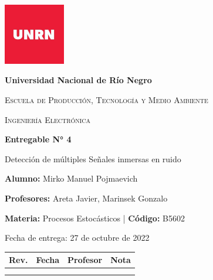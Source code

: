\documentclass[12pt,letterpaper]{article}     %
\begin{document}

\begin{titlepage}
\centering
{\includegraphics[width=0.2\textwidth]{imagenes/LOGOUNRN.jpg}\par}
\vspace{0.5cm}
{\bfseries\large Universidad Nacional de Río Negro \par}
\vspace{0.5cm}
{\scshape\large Escuela de Producción, Tecnología y Medio Ambiente \par}
\vspace{0.5cm}
{\scshape\large Ingeniería Electrónica \par}
\vspace{3cm}
{\bfseries\Large Entregable N° 4 \par}
{\Large Detección de múltiples Señales inmersas en ruido\par}
\vfill
{\large \textbf{Alumno:} Mirko Manuel Pojmaevich\par}
{\large \textbf{Profesores:} Areta Javier, Marinsek Gonzalo\par}
{\large \textbf{Materia:} Procesos Estocásticos | \textbf{Código:} B5602\par}
\vspace{3cm}
{\large Fecha de entrega: 27 de octubre de 2022 \par}
\vspace{1cm}
\begin{table}[!ht]
\begin{center}
\begin{tabular}{| c | c | c | c |}
\hline
\textbf{Rev.} & \textbf{Fecha} & \textbf{Profesor} & \textbf{Nota} \\ 
\hline
 &  & & \\
 \hline
 & & &  \\
\hline
\end{tabular}
\end{center}
\end{table}
\end{titlepage}
\newpage
\tableofcontents
\newpage
\end{document}
